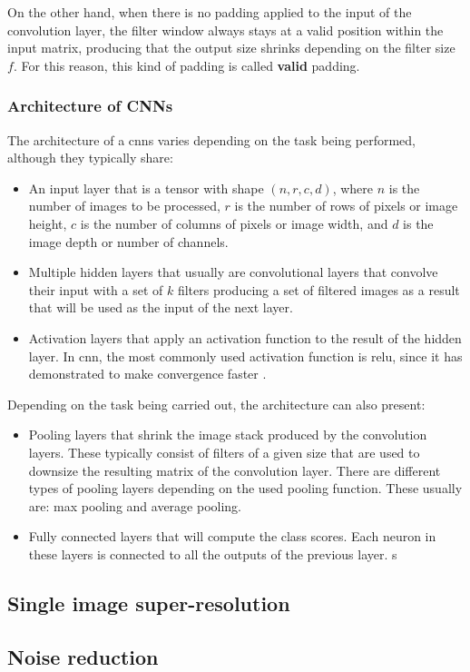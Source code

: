 On the other hand, when there is no padding applied to the input of the convolution layer, the filter window always stays at a valid position within the input matrix, producing that the output size shrinks depending on the filter size $f$. For this reason, this kind of padding is called \textbf{valid} padding.

\subsubsection*{Architecture of CNNs}

The architecture of a \glspl{cnn} varies depending on the task being performed, although they typically share:
\begin{itemize}
	\item An input layer that is a tensor with shape 
	$(n, r, c, d)$, where $n$ is the number of images to be processed, $r$ is the number of rows of pixels or image height, $c$ is the number of columns of pixels or image width, and $d$ is the image depth or number of channels.
	\item Multiple hidden layers that usually are convolutional layers that convolve their input with a set of $k$ filters producing a set of filtered images as a result that will be used as the input of the next layer.
	\item Activation layers that apply an activation function to the result of the hidden layer. In \gls{cnn}, the most commonly used activation function is \gls{relu}, since it has demonstrated to make convergence faster \cite{RELU}.
\end{itemize}

Depending on the task being carried out, the architecture can also present:
\begin{itemize}
	\item Pooling layers that shrink the image stack produced by the convolution layers. These typically consist of filters of a given size that are used to downsize the resulting matrix of the convolution layer. There are different types of pooling layers depending on the used pooling function. These usually are: max pooling and average pooling.
	\item Fully connected layers that will compute the class scores. Each neuron in these layers is connected to all the outputs of the previous layer. s
\end{itemize}


\subsection{Single image super-resolution}

\subsection{Noise reduction}